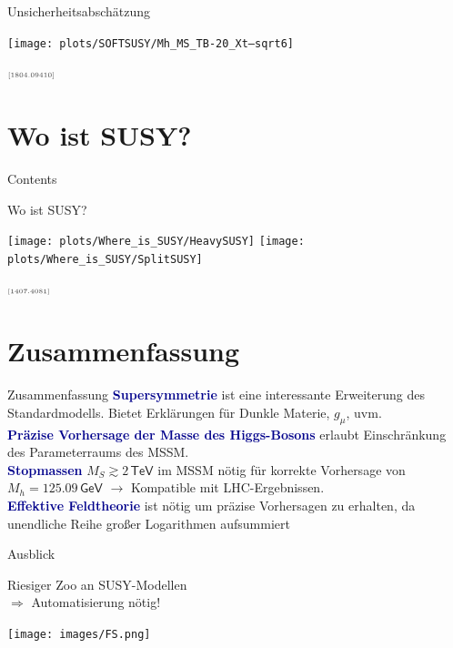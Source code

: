 \documentclass[hyperref={pdfpagelabels=false},ngerman]{beamer}
\newcommand{\eh}[1]{\,\mathsf{#1}}
\newcommand{\MS}{\ensuremath{M_S}}
\newcommand{\mycite}[1]{\ensuremath{\text{\textcolor{darkgray}{\tiny [#1]}}}}
\renewcommand{\emph}[1]{\textbf{\textcolor{darkblue}{#1}}}
\newcommand{\GeV}{\eh{GeV}}
\newcommand{\TeV}{\eh{TeV}}
\begin{document}
\begin{frame}{Unsicherheitsabschätzung}
  \begin{center}
    \texttt{[image: plots/SOFTSUSY/Mh\_MS\_TB-20\_Xt--sqrt6]}
  \end{center}
  \raggedleft\mycite{1804.09410}
\end{frame}


\section{Wo ist SUSY?}

\begin{frame}{Contents}
  \tableofcontents[currentsection]  
\end{frame}

\begin{frame}{Wo ist SUSY?}
  \begin{center}
    \texttt{[image: plots/Where\_is\_SUSY/HeavySUSY]}\hfill
    \texttt{[image: plots/Where\_is\_SUSY/SplitSUSY]}
  \end{center}
  \raggedleft\mycite{1407.4081}
\end{frame}


\section{Zusammenfassung}

\begin{frame}{Zusammenfassung}
  \emph{Supersymmetrie} ist eine interessante Erweiterung des
  Standardmodells.  Bietet Erklärungen für Dunkle Materie,
  $g_\mu$, uvm.
  \\[1em]
  \emph{Präzise Vorhersage der Masse des Higgs-Bosons} erlaubt
  Einschränkung des Parameterraums des MSSM.
  \\[1em]
  \emph{Stopmassen} $\MS \gtrsim 2\TeV$ im MSSM nötig für korrekte
  Vorhersage von $M_h = 125.09\GeV$ $\rightarrow$ Kompatible mit LHC-Ergebnissen.
  \\[1em]
  \emph{Effektive Feldtheorie} ist nötig um präzise Vorhersagen zu
  erhalten, da unendliche Reihe großer Logarithmen aufsummiert
\end{frame}

\begin{frame}{Ausblick}
  \begin{center}
    \LARGE Riesiger Zoo an SUSY-Modellen\\ $\Rightarrow$ Automatisierung nötig!
  \end{center}
  \begin{center}
    \texttt{[image: images/FS.png]}
  \end{center}
\end{frame}
\end{document}
